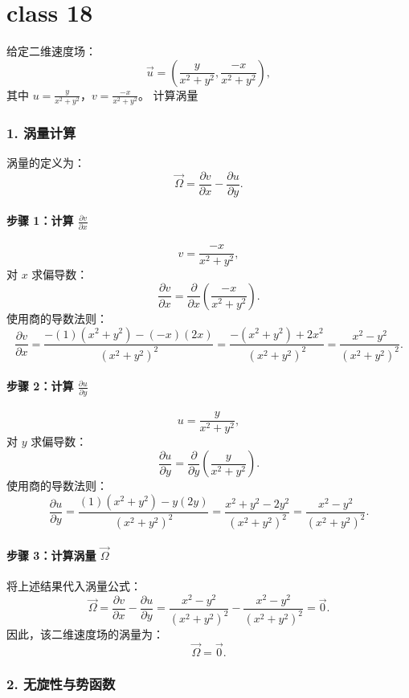 \section{class 18}
\begin{example}
    给定二维速度场：
\[
\vec{u} = \left( \frac{y}{x^2 + y^2}, \frac{-x}{x^2 + y^2} \right),
\]
其中 \(u = \frac{y}{x^2 + y^2}\)，\(v = \frac{-x}{x^2 + y^2}\)。
计算涡量
\begin{solution}
\subsubsection*{1. 涡量计算}

涡量的定义为：
\[
\vec{\Omega} = \frac{\partial v}{\partial x} - \frac{\partial u}{\partial y}.
\]
\paragraph{步骤 1：计算 \(\frac{\partial v}{\partial x}\)}
\[
v = \frac{-x}{x^2 + y^2},
\]
对 \(x\) 求偏导数：
\[
\frac{\partial v}{\partial x} = \frac{\partial}{\partial x} \left( \frac{-x}{x^2 + y^2} \right).
\]
使用商的导数法则：
\[
\frac{\partial v}{\partial x} = \frac{-(1)(x^2 + y^2) - (-x)(2x)}{(x^2 + y^2)^2} = \frac{-(x^2 + y^2) + 2x^2}{(x^2 + y^2)^2} = \frac{x^2 - y^2}{(x^2 + y^2)^2}.
\]

\paragraph{步骤 2：计算 \(\frac{\partial u}{\partial y}\)}
\[
u = \frac{y}{x^2 + y^2},
\]
对 \(y\) 求偏导数：
\[
\frac{\partial u}{\partial y} = \frac{\partial}{\partial y} \left( \frac{y}{x^2 + y^2} \right).
\]
使用商的导数法则：
\[
\frac{\partial u}{\partial y} = \frac{(1)(x^2 + y^2) - y(2y)}{(x^2 + y^2)^2} = \frac{x^2 + y^2 - 2y^2}{(x^2 + y^2)^2} = \frac{x^2 - y^2}{(x^2 + y^2)^2}.
\]

\paragraph{步骤 3：计算涡量 \(\vec{\Omega}\)}
将上述结果代入涡量公式：
\[
\vec{\Omega} = \frac{\partial v}{\partial x} - \frac{\partial u}{\partial y} = \frac{x^2 - y^2}{(x^2 + y^2)^2} - \frac{x^2 - y^2}{(x^2 + y^2)^2} = \vec{0}.
\]
因此，该二维速度场的涡量为：
\[
\boxed{\vec{\Omega} = \vec{0}}.
\]

\subsubsection*{2. 无旋性与势函数}


\end{solution}
\end{example}
